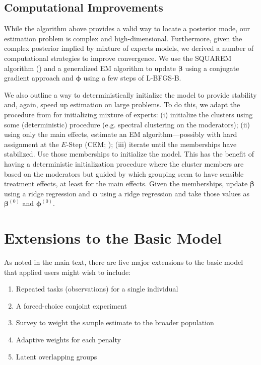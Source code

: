 \subsection{Computational Improvements}
\label{sec:app_derivations_improve}

While the algorithm above provides a valid way to locate a posterior
mode, our estimation problem is complex and
high-dimensional. Furthermore, given the complex posterior implied by
mixture of experts models, we derived a number of computational
strategies to improve convergence. We use the SQUAREM algorithm
(\citealt{varadhan2008simple}) and a generalized EM algorithm to
update $\bm{\beta}$ using a conjugate gradient approach and
$\bm{\phi}$ using a few steps of L-BFGS-B.

We also outline a way to deterministically initialize the model to provide stability and, again, speed up estimation on large problems. To do this, we adapt the procedure from \cite{murphy2020init} for initializing mixture of experts: (i) initialize the clusters using some (deterministic) procedure (e.g. spectral clustering on the moderators); (ii) using only the main effects, estimate an EM algorithm---possibly with hard assignment at the $E$-Step (CEM; \citealt{celeux1992classification}); (iii) iterate until the memberships have stabilized. Use those memberships to initialize the model. This has the benefit of having a deterministic initialization procedure where the cluster members are based on the moderators but guided by which grouping seem to have sensible treatment effects, at least for the main effects. Given the memberships, update $\bm{\beta}$ using a ridge regression and $\bm{\phi}$ using a ridge regression and take those values as $\bm{\beta}^{(0)}$ and $\bm{\phi}^{(0)}$.



\section{Extensions to the Basic Model}
\label{sec:app_extensions}

As noted in the main text, there are five major extensions to the basic model that applied users might wish to include:

\begin{enumerate}
	\item Repeated tasks (observations) for a single individual
	\item A forced-choice conjoint experiment
	\item Survey  to weight the sample estimate to the broader population
	\item Adaptive weights for each penalty
	\item Latent overlapping groups
\end{enumerate}

